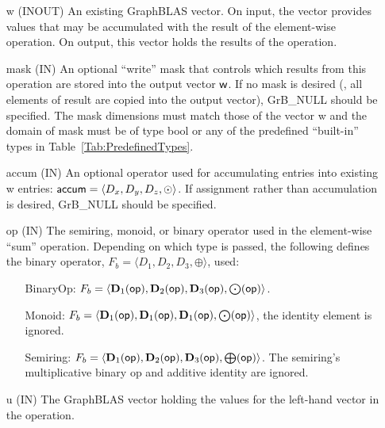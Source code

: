 \begin{itemize}[leftmargin=1.1in]
    \item[{\sf w}]    ({\sf INOUT}) An existing GraphBLAS vector.  On input,
    the vector provides values that may be accumulated with the result of the
    element-wise operation.  On output, this vector holds the results of the
    operation.

    \item[{\sf mask}]  ({\sf IN}) An optional ``write'' mask that controls which
    results from this operation are stored into the output vector
    ${\sf w}$.  If no mask is desired (\ie, all elements
    of result are copied into the output vector), {\sf GrB\_NULL}
    should be specified. The mask dimensions must match those of the
    vector {\sf w} and the domain of {\sf mask} must be
    of type {\sf bool} or any of the predefined ``built-in'' types in
    Table~\ref{Tab:PredefinedTypes}.

    \item[{\sf accum}] ({\sf IN}) An optional operator used for accumulating
    entries into existing {\sf w} entries: ${\sf accum} = \langle D_x,
    D_y, D_z,\odot \rangle$. If assignment rather than accumulation is
    desired, {\sf GrB\_NULL} should be specified.

    \item[{\sf op}]    ({\sf IN}) The semiring, monoid, or binary operator 
    used in the element-wise ``sum'' operation.  Depending on which type is
    passed, the following defines the binary operator, 
    $F_b=\langle D_1,D_2,D_3,\oplus\rangle$, used:
    \begin{itemize}[leftmargin=1.1in]
    \item[BinaryOp:] $F_b = \langle \bold{D}_1({\sf op}), \bold{D}_2({\sf op}),
    \bold{D}_3({\sf op}),\bold{\bigodot}({\sf op})\rangle$.  
    \item[Monoid:] $F_b = \langle \bold{D}_1({\sf op}), \bold{D}_1({\sf op}),
    \bold{D}_1({\sf op}),\bold{\bigodot}({\sf op})\rangle$,
    the identity element is ignored. 
    \item[Semiring:] $F_b = \langle \bold{D}_1({\sf op}), \bold{D}_2({\sf op}),
    \bold{D}_3({\sf op}),\bold{\bigoplus}({\sf op})\rangle$.  The semiring's 
    multiplicative binary op and additive identity are ignored.
    \end{itemize}
    
    \item[{\sf u}]     ({\sf IN}) The GraphBLAS vector holding the values for
    the left-hand vector in the operation.
    

\end{itemize}
